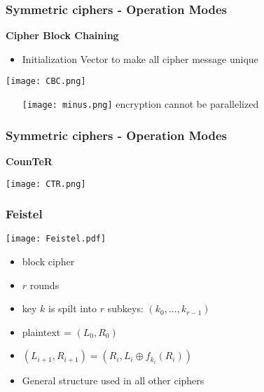 \documentclass[
hyperref={pdfpagelabels=false}
,xcolor=table
]
{beamer}
\newcommand{\minus}{{\texttt{[image: minus.png]}}}
\begin{document}
\begin{frame}
  \frametitle{Symmetric ciphers - Operation Modes}
  \textbf{Cipher Block Chaining}
  \begin{itemize}
  \item Initialization Vector to make all cipher message unique
  \end{itemize}


  \begin{center}
    \texttt{[image: CBC.png]}
  \end{center}
  \begin{itemize}
  \item[\minus] encryption cannot be parallelized
  \end{itemize}
  
\end{frame}


\begin{frame}
  \frametitle{Symmetric ciphers - Operation Modes}
  \textbf{CounTeR}


  \begin{center}
    \texttt{[image: CTR.png]}
  \end{center}

\end{frame}





\begin{frame}
  \frametitle{Feistel}
  \begin{minipage}{.35\linewidth}
    \texttt{[image: Feistel.pdf]}
  \end{minipage}
  \begin{minipage}{.55\linewidth}
    \begin{itemize}
    \item block cipher
    \item $r$ rounds
    \item key $k$ is spilt into $r$ subkeys: $(k_0, ..., k_{r-1})$
    \item plaintext = $(L_0, R_0)$
    \item $(L_{i+1}, R_{i+1}) = (R_i, L_i \oplus f_{k_i}(R_i))$
    \item General structure used in all other ciphers
    \end{itemize}
  \end{minipage}
\end{frame}
\end{document}
